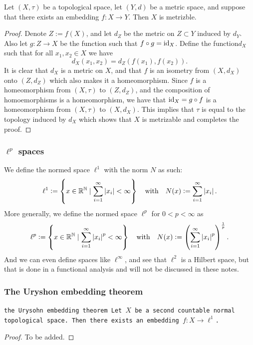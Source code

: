 \documentclass[11pt,a4paper]{article}
\begin{document}
\begin{proposition}
  Let $(X, \tau)$ be a topological space, let $(Y, d)$ be a metric space,
  and suppose that there exists an embedding $f \colon X \to Y$.
  Then $X$ is metrizble.
\end{proposition}
\begin{proof}
  Denote $Z := f(X)$, and let $d_Z$ be the metric on $Z \subset Y$ induced
  by $d_Y$. Also let $g \colon Z \to X$ be the function such that
  $f \circ g = \operatorname{id}_X$. Define the function$d_X$ such that for all 
  $x_1, x_2 \in X$ we have
  \[
    d_X(x_1, x_2) = d_Z(f(x_1), f(x_2)).
  \]
  It is clear that $d_X$ is a metric on $X$, and that $f$ is an isometry
  from $(X,d_X)$ onto $(Z,d_Z)$ which also makes it a homeomorphism.
  Since $f$ is a homeomorphism from $(X, \tau)$ to $(Z, d_Z)$, and
  the composition of homoemorphisms is a homeomorphism, we have that
  $\operatorname{id}_X = g \circ f$ is a homeomorphism from $(X, \tau)$ to $(X, d_X)$.
  This implies that $\tau$ is equal to the topology induced by $d_X$
  which shows that $X$ is metrizable and completes the proof.
\end{proof}

\subsubsection{\texorpdfstring{$\ell^p$}{l} spaces}

\begin{definition}
  We define the normed space $\ell^1$ with the norm $N$ as such:
  \[
    \ell^1 := \left\{x \in \mathbb{R}^{\mathbb{N}} \mid \sum_{i=1}^{\infty} \left\lvert x_i\right\rvert < \infty\right\}
    \quad \text{with} \quad
    N(x) := \sum_{i=1}^{\infty} \left\lvert x_i\right\rvert.
  \]
  More generally, we define the normed space $\ell^p$ for $0 < p < \infty$ as
  \[
    \ell^p :=
    \left\{x \in \mathbb{R}^{\mathbb{N}} \mid \sum_{i=1}^{\infty} \left\lvert x_i\right\rvert^p < \infty\right\}
    \quad \text{with} \quad
    N(x) := \left(\sum_{i=1}^{\infty} \left\lvert x_i\right\rvert^p\right)^{\frac{1}{p}}.
  \]
  And we can even define spaces like $\ell^{\infty}$, and see that
  $\ell^2$ is a Hilbert space, but that is done in a functional analysis
  and will not be discussed in these notes.
\end{definition}

\subsubsection{The Uryshon embedding theorem}

\begin{theorem}\tt{the Urysohn embedding theorem}
  Let $X$ be a second countable normal topological space.
  Then there exists an embedding $f \colon X \to \ell^1$.
\end{theorem}
\begin{proof}
  To be added.
\end{proof}
\end{document}
